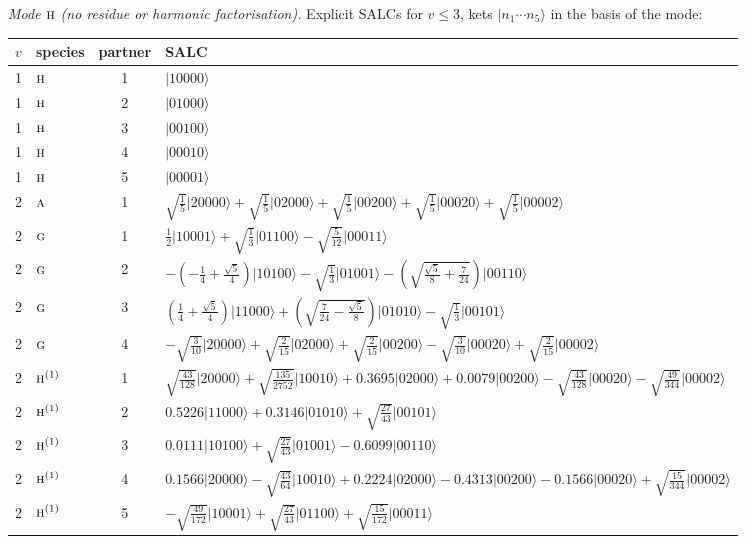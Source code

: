 \documentclass[11pt]{article}
\newcommand{\irr}[1]{\text{\normalfont\scshape #1}}
\newcommand{\occ}[1]{\lvert #1\rangle}
\begin{document}
\emph{Mode $\irr{h}$ (no residue or harmonic factorisation).} Explicit SALCs for $v\le3$, kets $\occ{n_1\cdots n_{5}}$ in the basis of the mode:
\begin{longtable}{c l c p{}}\hline $v$ & species & partner & SALC\\ \hline\endhead
1 & $\irr{h}$ & 1 & $\occ{10000}$\\
1 & $\irr{h}$ & 2 & $\occ{01000}$\\
1 & $\irr{h}$ & 3 & $\occ{00100}$\\
1 & $\irr{h}$ & 4 & $\occ{00010}$\\
1 & $\irr{h}$ & 5 & $\occ{00001}$\\
\hline
2 & $\irr{a}$ & 1 & $\sqrt{\tfrac{1}{5}}\occ{20000}+\sqrt{\tfrac{1}{5}}\occ{02000}+\sqrt{\tfrac{1}{5}}\occ{00200}+\sqrt{\tfrac{1}{5}}\occ{00020}+\sqrt{\tfrac{1}{5}}\occ{00002}$\\
2 & $\irr{g}$ & 1 & $\tfrac{1}{2}\occ{10001}+\sqrt{\tfrac{1}{3}}\occ{01100}-\sqrt{\tfrac{5}{12}}\occ{00011}$\\
2 & $\irr{g}$ & 2 & $-(- \frac{1}{4} + \frac{\sqrt{5}}{4})\occ{10100}-\sqrt{\tfrac{1}{3}}\occ{01001}-(\sqrt{\frac{\sqrt{5}}{8} + \frac{7}{24}})\occ{00110}$\\
2 & $\irr{g}$ & 3 & $(\frac{1}{4} + \frac{\sqrt{5}}{4})\occ{11000}+(\sqrt{\frac{7}{24} - \frac{\sqrt{5}}{8}})\occ{01010}-\sqrt{\tfrac{1}{3}}\occ{00101}$\\
2 & $\irr{g}$ & 4 & $-\sqrt{\tfrac{3}{10}}\occ{20000}+\sqrt{\tfrac{2}{15}}\occ{02000}+\sqrt{\tfrac{2}{15}}\occ{00200}-\sqrt{\tfrac{3}{10}}\occ{00020}+\sqrt{\tfrac{2}{15}}\occ{00002}$\\
2 & $\irr{h}^{(1)}$ & 1 & $\sqrt{\tfrac{43}{128}}\occ{20000}+\sqrt{\tfrac{135}{2752}}\occ{10010}+0.3695\occ{02000}+0.0079\occ{00200}-\sqrt{\tfrac{43}{128}}\occ{00020}-\sqrt{\tfrac{49}{344}}\occ{00002}$\\
2 & $\irr{h}^{(1)}$ & 2 & $0.5226\occ{11000}+0.3146\occ{01010}+\sqrt{\tfrac{27}{43}}\occ{00101}$\\
2 & $\irr{h}^{(1)}$ & 3 & $0.0111\occ{10100}+\sqrt{\tfrac{27}{43}}\occ{01001}-0.6099\occ{00110}$\\
2 & $\irr{h}^{(1)}$ & 4 & $0.1566\occ{20000}-\sqrt{\tfrac{43}{64}}\occ{10010}+0.2224\occ{02000}-0.4313\occ{00200}-0.1566\occ{00020}+\sqrt{\tfrac{15}{344}}\occ{00002}$\\
2 & $\irr{h}^{(1)}$ & 5 & $-\sqrt{\tfrac{49}{172}}\occ{10001}+\sqrt{\tfrac{27}{43}}\occ{01100}+\sqrt{\tfrac{15}{172}}\occ{00011}$\\

\end{longtable}
\end{document}
